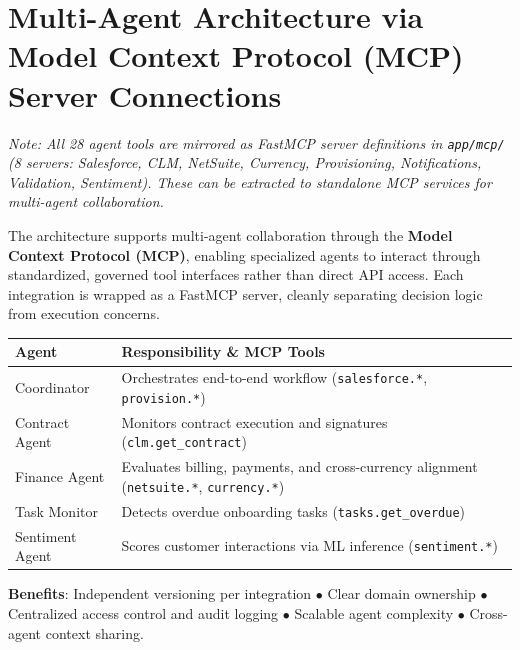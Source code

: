 \documentclass[8pt,a4paper]{article}
\begin{document}
\section{Multi-Agent Architecture via Model Context Protocol (MCP) Server Connections}

\begin{minipage}[t]{0.54\textwidth}
\vspace{0pt}
{\scriptsize\textit{Note: All 28 agent tools are mirrored as FastMCP server definitions in \texttt{app/mcp/} (8 servers: Salesforce, CLM, NetSuite, Currency, Provisioning, Notifications, Validation, Sentiment). These can be extracted to standalone MCP services for multi-agent collaboration.}}

\vspace{0.1em}
{\scriptsize
The architecture supports multi-agent collaboration through the \textbf{Model Context Protocol (MCP)}, enabling specialized agents to interact through standardized, governed tool interfaces rather than direct API access. Each integration is wrapped as a FastMCP server, cleanly separating decision logic from execution concerns.
}

\vspace{0.1em}
\begin{table}[H]
\scriptsize
\begin{tabularx}{\textwidth}{@{}lX@{}}
\toprule
\textbf{Agent} & \textbf{Responsibility \& MCP Tools} \\
\midrule
Coordinator & Orchestrates end-to-end workflow (\texttt{salesforce.*}, \texttt{provision.*}) \\
Contract Agent & Monitors contract execution and signatures (\texttt{clm.get\_contract}) \\
Finance Agent & Evaluates billing, payments, and cross-currency alignment (\texttt{netsuite.*}, \texttt{currency.*}) \\
Task Monitor & Detects overdue onboarding tasks (\texttt{tasks.get\_overdue}) \\
Sentiment Agent & Scores customer interactions via ML inference (\texttt{sentiment.*}) \\
\bottomrule
\end{tabularx}
\end{table}

\vspace{-15pt}
{\scriptsize\textbf{Benefits}: Independent versioning per integration $\bullet$ Clear domain ownership $\bullet$ Centralized access control and audit logging $\bullet$ Scalable agent complexity $\bullet$ Cross-agent context sharing.}


\end{minipage}
\end{document}

